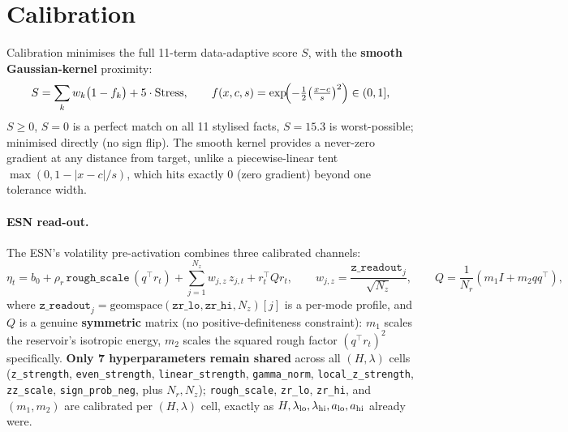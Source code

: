 \documentclass[11pt,a4paper]{article}
\begin{document}
\section{Calibration}
Calibration minimises the full 11-term data-adaptive score $S$, with
the \textbf{smooth Gaussian-kernel} proximity:
\begin{equation}
S=\sum_k w_k\bigl(1-f_k\bigr)+5\cdot\mathrm{Stress},\qquad
f(x,c,s)=\exp\!\Bigl(-\tfrac12\bigl(\tfrac{x-c}{s}\bigr)^2\Bigr)\in(0,1],
\end{equation}
$S\geq0$, $S=0$ is a perfect match on all 11 stylised facts, $S=15.3$ is
worst-possible; minimised directly (no sign flip). The smooth kernel
provides a never-zero gradient at any distance from target, unlike a
piecewise-linear tent $\max(0,1-|x-c|/s)$, which hits exactly 0 (zero
gradient) beyond one tolerance width.

\paragraph{ESN read-out.} The ESN's volatility pre-activation combines
three calibrated channels:
\begin{equation}
\eta_t = b_0 + \rho_r\,\texttt{rough\_scale}\,(q^\top r_t)
       + \sum_{j=1}^{N_z} w_{j,z}\,z_{j,t} + r_t^\top Qr_t,
\qquad w_{j,z}=\frac{\texttt{z\_readout}_j}{\sqrt{N_z}},
\qquad Q=\frac{1}{N_r}(m_1I+m_2qq^\top),
\end{equation}
where $\texttt{z\_readout}_j=\mathrm{geomspace}(\texttt{zr\_lo},
\texttt{zr\_hi},N_z)[j]$ is a per-mode profile, and $Q$ is a genuine
\textbf{symmetric} matrix (no positive-definiteness constraint): $m_1$
scales the reservoir's isotropic energy, $m_2$ scales the squared rough
factor $(q^\top r_t)^2$ specifically. \textbf{Only 7 hyperparameters
remain shared} across all $(H,\lambda)$ cells
(\texttt{z\_strength}, \texttt{even\_strength}, \texttt{linear\_strength},
\texttt{gamma\_norm}, \texttt{local\_z\_strength}, \texttt{zz\_scale},
\texttt{sign\_prob\_neg}, plus $N_r,N_z$); \texttt{rough\_scale},
\texttt{zr\_lo}, \texttt{zr\_hi}, and $(m_1,m_2)$ are calibrated
per $(H,\lambda)$ cell, exactly as $H,\lambda_{\rm lo},\lambda_{\rm hi},
a_{\rm lo},a_{\rm hi}$ already were.
\end{document}
